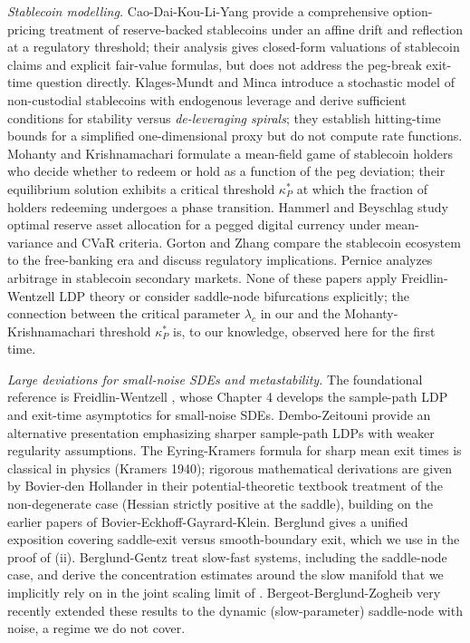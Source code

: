 \documentclass[11pt,a4paper]{article}
\theoremstyle{plain}
\theoremstyle{definition}
\begin{document}
\emph{Stablecoin modelling.}
Cao-Dai-Kou-Li-Yang \cite{CaoDaiKouLiYang2025} provide a comprehensive option-pricing treatment of reserve-backed stablecoins under an affine drift and reflection at a regulatory threshold; their analysis gives closed-form valuations of stablecoin claims and explicit fair-value formulas, but does not address the peg-break exit-time question directly.
Klages-Mundt and Minca \cite{KlagesMundtMinca2022} introduce a stochastic model of non-custodial stablecoins with endogenous leverage and derive sufficient conditions for stability versus \emph{de-leveraging spirals}; they establish hitting-time bounds for a simplified one-dimensional proxy but do not compute rate functions.
Mohanty and Krishnamachari \cite{MohantyKrishnamachari2026} formulate a mean-field game of stablecoin holders who decide whether to redeem or hold as a function of the peg deviation; their equilibrium solution exhibits a critical threshold $\kappa_P^*$ at which the fraction of holders redeeming undergoes a phase transition.
Hammerl and Beyschlag \cite{HammerlBeyschlag2025} study optimal reserve asset allocation for a pegged digital currency under mean-variance and CVaR criteria.
Gorton and Zhang \cite{GortonZhang2023} compare the stablecoin ecosystem to the free-banking era and discuss regulatory implications.
Pernice \cite{Pernice2021} analyzes arbitrage in stablecoin secondary markets.
None of these papers apply Freidlin-Wentzell LDP theory or consider saddle-node bifurcations explicitly; the connection between the critical parameter $\lambda_c$ in our  and the Mohanty-Krishnamachari threshold $\kappa_P^*$ is, to our knowledge, observed here for the first time.

\emph{Large deviations for small-noise SDEs and metastability.}
The foundational reference is Freidlin-Wentzell \cite{FreidlinWentzell2012}, whose Chapter 4 develops the sample-path LDP and exit-time asymptotics for small-noise SDEs.
Dembo-Zeitouni \cite{DemboZeitouni2010} provide an alternative presentation emphasizing sharper sample-path LDPs with weaker regularity assumptions.
The Eyring-Kramers formula for sharp mean exit times is classical in physics (Kramers 1940); rigorous mathematical derivations are given by Bovier-den Hollander \cite{BovierGayrard2016} in their potential-theoretic textbook treatment of the non-degenerate case (Hessian strictly positive at the saddle), building on the earlier papers of Bovier-Eckhoff-Gayrard-Klein.
Berglund \cite{Berglund2013} gives a unified exposition covering saddle-exit versus smooth-boundary exit, which we use in the proof of (ii).
Berglund-Gentz \cite{BerglundGentz2006} treat slow-fast systems, including the saddle-node case, and derive the concentration estimates around the slow manifold that we implicitly rely on in the joint scaling limit of .
Bergeot-Berglund-Zogheib \cite{BergeotBerglundZogheib2025} very recently extended these results to the dynamic (slow-parameter) saddle-node with noise, a regime we do not cover.
\end{document}
